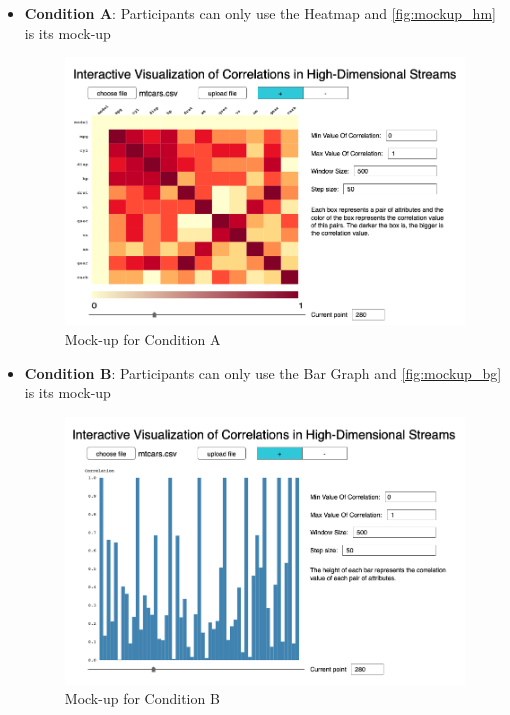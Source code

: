 \begin{itemize}
	\item \textbf{Condition A}: Participants can only use the Heatmap and \autoref{fig:mockup_hm} is its mock-up
	\begin{figure}[htb]
		\centering
		\includegraphics[width=15cm]{pictures/mockup_hm}
		\caption{Mock-up for Condition A}
		\label{fig:mockup_hm}
	\end{figure}

	\item \textbf{Condition B}: Participants can only use the Bar Graph and \autoref{fig:mockup_bg} is its mock-up
	\begin{figure}[htb]
		\centering
		\includegraphics[width=15cm]{pictures/mockup_bg}
		\caption{Mock-up for Condition B}
		\label{fig:mockup_bg}
	\end{figure}
	

\end{itemize}
